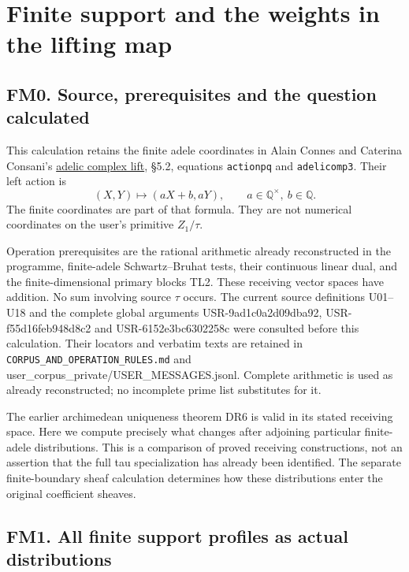 \section{Finite support and the weights in the lifting
map}\label{finite-support-and-the-weights-in-the-lifting-map}

\subsection{FM0. Source, prerequisites and the question
calculated}\label{fm0.-source-prerequisites-and-the-question-calculated}

This calculation retains the finite adele coordinates in Alain Connes
and Caterina Consani's \href{https://arxiv.org/abs/1805.10501v1}{adelic
complex lift}, §5.2, equations \texttt{actionpq} and
\texttt{adelicomp3}. Their left action is \[
(X,Y)\longmapsto(aX+b,aY),\qquad a\in\mathbb Q^\times,
\ b\in\mathbb Q.
\tag{FM0.1}
\] The finite coordinates are part of that formula. They are not
numerical coordinates on the user's primitive \(Z_1/\tau\).

Operation prerequisites are the rational arithmetic already
reconstructed in the programme, finite-adele Schwartz--Bruhat tests,
their continuous linear dual, and the finite-dimensional primary blocks
TL2. These receiving vector spaces have addition. No sum involving
source \(\tau\) occurs. The current source definitions U01--U18 and the
complete global arguments USR-9ad1c0a2d09dba92, USR-f55d16feb948d8c2 and
USR-6152e3bc6302258c were consulted before this calculation. Their
locators and verbatim texts are retained in
\nolinkurl{CORPUS_AND_OPERATION_RULES.md} and
user\_corpus\_private/USER\_MESSAGES.jsonl. Complete arithmetic is used
as already reconstructed; no incomplete prime list substitutes for it.

The earlier archimedean uniqueness theorem DR6 is valid in its stated
receiving space. Here we compute precisely what changes after adjoining
particular finite-adele distributions. This is a comparison of proved
receiving constructions, not an assertion that the full tau
specialization has already been identified. The separate finite-boundary
sheaf calculation determines how these distributions enter the original
coefficient sheaves.

\subsection{FM1. All finite support profiles as actual
distributions}\label{fm1.-all-finite-support-profiles-as-actual-distributions}

